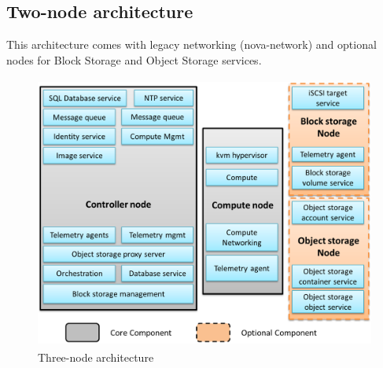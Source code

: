    \subsection{Two-node architecture}
    \par This architecture comes with legacy networking (nova-network) and optional nodes for Block Storage and Object Storage services.
    
    \begin{figure}[h]
        \centering
        \includegraphics[width=15cm,height=9cm]{images/two_node_arch.png}
        \caption{Three-node architecture}
    \end{figure}
    
